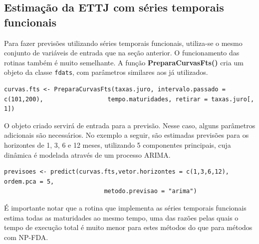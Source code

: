 \documentclass[
	12pt,				%
	openright,			%
	oneside,			%
	a4paper,			%
	english,			%
	brazil				%
	]{dissertacao-ufrgs-abntex2}
\begin{document}
\begin{apendicesenv}
\section{Estimação da ETTJ com séries temporais funcionais}

Para fazer previsões utilizando séries temporais funcionais, utiliza-se o mesmo conjunto de variáveis de entrada que na seção anterior. O funcionamento das rotinas também é muito semelhante. A função \textbf{PreparaCurvasFts()} cria um objeto da classe \texttt{fdats}, com parâmetros similares aos já utilizados.
\begin{lstlisting} 
curvas.fts <- PreparaCurvasFts(taxas.juro, intervalo.passado = c(101,200), 					tempo.maturidades, retirar = taxas.juro[, 1])
\end{lstlisting} 
O objeto criado servirá de entrada para a previsão. Nesse caso, alguns parâmetros adicionais são necessários. No exemplo a seguir, são estimadas previsões para os horizontes de 1, 3, 6 e 12 meses, utilizando 5 componentes principais, cuja dinâmica é modelada através de um processo ARIMA. 
\begin{lstlisting} 
previsoes <- predict(curvas.fts,vetor.horizontes = c(1,3,6,12), ordem.pca = 5, 
							metodo.previsao = "arima")
\end{lstlisting}
É importante notar que a rotina que implementa as séries temporais funcionais estima todas as maturidades ao mesmo tempo, uma das razões pelas quais o tempo de execução total é muito menor para estes métodos do que para métodos com NP-FDA.


\end{apendicesenv}
%
%
%
%
%
%
%





\printindex
\end{document}
